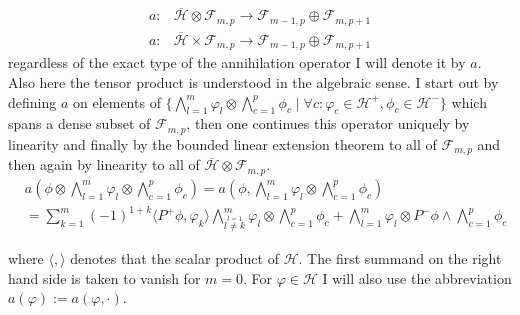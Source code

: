 \documentclass[b5paper,draft,openbib,12pt]{memoir}
\begin{document}
\begin{align}
a: &\overline{\mathcal{H}}\otimes \mathcal{F}_{m,p} \rightarrow \mathcal{F}_{m-1,p}\oplus \mathcal{F}_{m,p+1}\\
a: &\overline{\mathcal{H}}\times \mathcal{F}_{m,p} \rightarrow \mathcal{F}_{m-1,p}\oplus \mathcal{F}_{m,p+1}
\end{align}
regardless of the exact type of the annihilation operator I will denote it by \(a\). Also here the tensor product is 
understood in the algebraic sense.
I start out by defining \(a\) on elements of 
\(\{\bigwedge_{l=1}^m \varphi_l \otimes \bigwedge_{c=1}^p \phi_c  \mid \forall c:  \varphi_c \in \mathcal{H}^+, \phi_c \in \mathcal{H}^-   \}\)
which spans a dense subset of \(\mathcal{F}_{m,p}\), then one continues this operator uniquely by 
linearity and finally by the bounded linear extension theorem to all of \(\mathcal{F}_{m,p}\) and then 
again by linearity to all of \(\overline{\mathcal{H}}\otimes \mathcal{F}_{m,p}\).
\begin{align}
&a\left(\phi \otimes \bigwedge_{l=1}^m \varphi_l \otimes \bigwedge_{c=1}^p \phi_c\right)=a\left(\phi,\bigwedge_{l=1}^m \varphi_l \otimes \bigwedge_{c=1}^p \phi_c\right)\\
&= \sum_{k=1}^m (-1)^{1+k} \langle P^+ \phi, \varphi_k\rangle \bigwedge_{\overset{l=1}{l\neq k}}^m \varphi_l \otimes \bigwedge_{c=1}^p \phi_c + \bigwedge_{l=1}^m \varphi_l \otimes P^- \phi \wedge \bigwedge_{c=1}^p \phi_c
\end{align}


where \(\langle, \rangle\) denotes that the scalar product of \(\mathcal{H}\). The first summand on the right hand side is taken to vanish for \(m=0\). 
For \(\varphi\in \mathcal{H}\) I will also use the abbreviation \(a(\varphi):=a(\varphi,\cdot)\).
\end{document}

